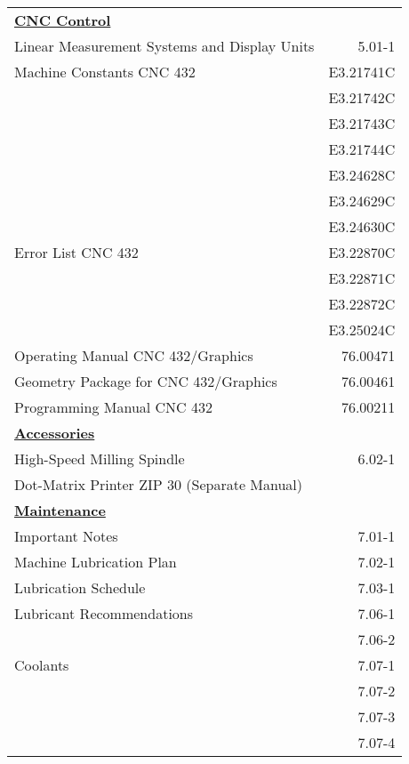 \newpage

\begin{tabularx}{\textwidth}{X r}
    \textbf{\underline{CNC Control}} & \\ %
    Linear Measurement Systems and Display Units \dotfill & 5.01-1 \\
    Machine Constants CNC 432 \dotfill & E3.21741C \\
     & E3.21742C \\
     & E3.21743C \\
     & E3.21744C \\
     & E3.24628C \\
     & E3.24629C \\
     & E3.24630C \\
    Error List CNC 432 \dotfill & E3.22870C \\
     & E3.22871C \\
     & E3.22872C \\
     & E3.25024C \\
    Operating Manual CNC 432/Graphics \dotfill & 76.00471 \\
    Geometry Package for CNC 432/Graphics \dotfill & 76.00461 \\
    Programming Manual CNC 432 \dotfill & 76.00211 \\[0.5cm]

    \textbf{\underline{Accessories}} & \\ %
    High-Speed Milling Spindle \dotfill & 6.02-1 \\
    Dot-Matrix Printer ZIP 30 (Separate Manual) \\[0.5cm] %

    \textbf{\underline{Maintenance}} & \\ %
    Important Notes \dotfill & 7.01-1 \\
    Machine Lubrication Plan \dotfill & 7.02-1 \\
    Lubrication Schedule \dotfill & 7.03-1 \\
    Lubricant Recommendations \dotfill & 7.06-1 \\
     & 7.06-2 \\
    Coolants \dotfill & 7.07-1 \\
     & 7.07-2 \\
     & 7.07-3 \\
     & 7.07-4 \\[0.5cm]
\end{tabularx}

